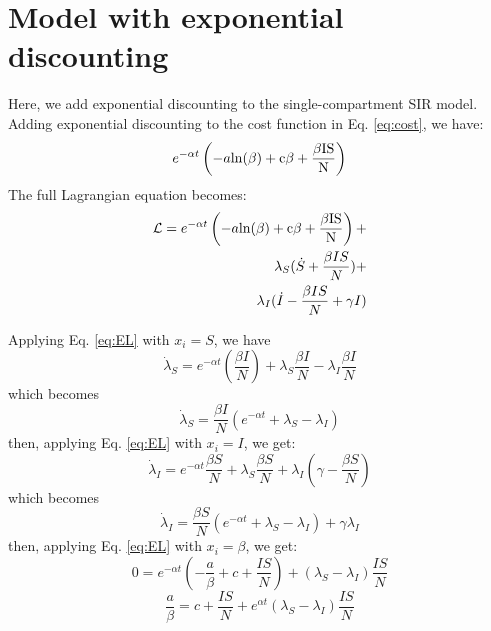 \documentclass[11pt]{article} %
\begin{document}
\section{Model with exponential discounting}
Here, we add exponential discounting to the single-compartment SIR model. 
Adding exponential discounting to the cost function in Eq. \ref{eq:cost}, we have:
\begin{equation}
e^{-\alpha t}\left(-a\rm{ln}({\beta})+c\beta+\frac{\beta IS}{N}\right)
\end{equation}
 The full Lagrangian equation becomes:
\begin{equation}
\begin{split}
\mathcal{L} =e^{-\alpha t} \left(-a \rm {ln}({\beta})+c\beta+\frac{\beta IS}{N}\right) +\\
\lambda_S(\dot{S} +\frac{\beta IS}{N})+\\
\lambda_I(\dot{I}-\frac{\beta IS}{N}+\gamma I)
\end{split}
\end{equation}

Applying Eq. \ref{eq:EL} with $x_i = S$, we have 
\begin{equation}
\dot{\lambda}_S = e^{-\alpha t}(\frac{\beta I}{N})+\lambda_S \frac{\beta I}{N}-\lambda_I \frac{\beta I}{N}
\end{equation}
which becomes
\begin{equation}
\dot{\lambda}_S = \frac{\beta I}{N}\left( e^{-\alpha t}+\lambda_S-\lambda_I \right)
\end{equation}
then, applying Eq. \ref{eq:EL} with $x_i = I$, we get:
\begin{equation}
\dot{\lambda}_I = e^{-\alpha t}\frac{\beta S}{N}+\lambda_S \frac{\beta S}{N}+\lambda_I(\gamma-\frac{\beta S}{N})
\end{equation}
which becomes
\begin{equation}
\dot{\lambda}_I = \frac{\beta S}{N}(e^{-\alpha t}+\lambda_S-\lambda_I)+\gamma \lambda_I
\end{equation}
then, applying Eq. \ref{eq:EL} with $x_i = \beta$, we get:
\begin{equation}
0=e^{-\alpha t}(-\frac{a}{\beta}+c+\frac{IS}{N})+(\lambda_S-\lambda_I)\frac{IS}{N}
\end{equation}
\begin{equation}
\frac{a}{\beta} = c+\frac{IS}{N}+e^{\alpha t}(\lambda_S-\lambda_I)\frac{IS}{N}
\end{equation}
\end{document}
